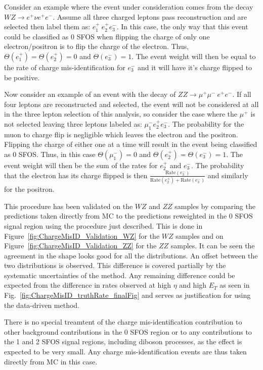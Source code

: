 Consider an example 
where the event under consideration comes from the decay $WZ\rightarrow e^{+}\nu e^{+}e^{-}$. Assume all three charged leptons pass reconstruction and are selected then label them as: $e^{+}_1~e^{+}_2e^{-}_3$. In this case,
the only way that this event could be classified as 0 SFOS when flipping the charge of only one electron/positron is to flip the charge of the electron.
Thus, $\Theta(e^{+}_1)=\Theta(e^{+}_2)=0$ and $\Theta(e^{-}_3)=1$.  The event weight will then be equal to the rate of charge mis-identification for  $e^{-}_3$ and it
will have it's charge flipped to be positive.

Now consider an example of an event with the decay of $ZZ\rightarrow \mu^{+}\mu^{-}~ e^{+}e^{-}$.
If all four leptons are reconstructed and selected, the event will not be considered at all in the three lepton selection of this analysis, so consider the 
case where the $\mu^{+}$ is not selected leaving three leptons labeled as: $\mu^{-}_1 e^{+}_2 e^{-}_3$.  The probability for the muon to charge flip
is negligible which leaves the electron and the positron. Flipping the charge of either one at a time will result in the event being classified as 0 SFOS.  Thus, in
this case $\Theta(\mu^{-}_1)=0$ and $\Theta(e^{+}_2)=\Theta(e^{-}_3)=1$. The event weight will then be the sum of the rates for $e^{+}_2$ and $e^{-}_3$.
The probability that the electron has its charge flipped is then $\frac{\textrm{Rate}(e^{-}_3) }{ \textrm{Rate}(e^{+}_2)+ \textrm{Rate}(e^{-}_3)}$ and similarly for the positron.

This procedure has been validated on the $WZ$ and $ZZ$ samples by comparing the predictions taken directly from MC to the predictions reweighted in the 0 SFOS signal region using the procedure just described. This is done in Figure~\ref{fig:ChargeMisID_Validation_WZ} for the $WZ$ samples and on Figure~\ref{fig:ChargeMisID_Validation_ZZ} for the $ZZ$ samples. It can be seen the agreement in the shape looks good for all the distributions. An offset between the two distributions is observed. This difference is covered partially by the systematic uncertainties of the method.  Any remaining difference could be expected from the difference in rates observed at high $\eta$ and high $E_{T}$ as seen in Fig.~\ref{fig:ChargeMisID_truthRate_finalFig} and serves as justification for using the data-driven method.

There is no special treamtent of the charge mis-identification contribution to other background contributions in the 0 SFOS region or to any contributions to the 
1 and 2 SFOS signal regions, including diboson processes, as the effect is expected to be very small.  Any charge mis-identification events are thus taken directly 
from MC in this case.


